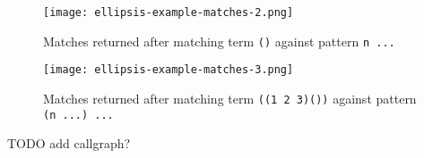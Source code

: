 \begin{figure}[h]
\texttt{[image: ellipsis-example-matches-2.png]}
\caption{Matches returned after matching term \texttt{()} against pattern \texttt{n ...}}
\label{ellipsis-example-matches-2}
\end{figure}

\begin{figure}[h]
\texttt{[image: ellipsis-example-matches-3.png]}
\caption{Matches returned after matching term \texttt{((1 2 3)())} against pattern \texttt{(n ...) ...} }
\label{ellipsis-example-matches-3}
\end{figure}

TODO add callgraph?
